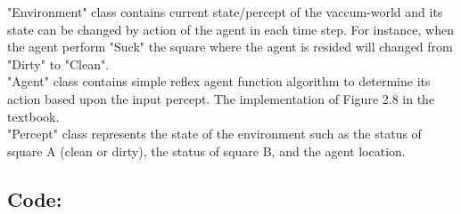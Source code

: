 \documentclass[a4paper]{article}
\begin{document}
"Environment" class contains current state/percept of the vaccum-world and its state can be changed by action of the agent in each time step. For instance, when the agent perform "Suck" the square where the agent is resided will changed from "Dirty" to "Clean". \\

"Agent" class contains simple reflex agent function algorithm to determine its action based upon the input percept. The implementation of 
Figure 2.8 in the textbook. \\

"Percept" class represents the state of the environment such as the status of square A (clean or dirty), the status of square B, and the agent location. \\

\subsection*{Code:}





\end{document}
